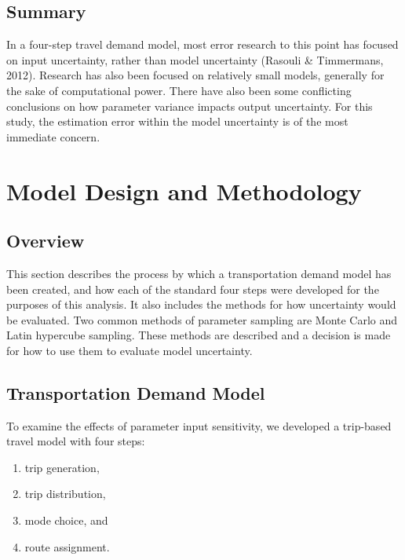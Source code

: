 \documentclass[fancy, masters,twoside]{byuthesis}
\providecommand{\tightlist}{%
  \setlength{\itemsep}{0pt}\setlength{\parskip}{0pt}}
\begin{document}
\hypertarget{summary}{%
\section{Summary}\label{summary}}

In a four-step travel demand model, most error research to this point has focused on input uncertainty, rather than model uncertainty (Rasouli \& Timmermans, 2012). Research has also been focused on relatively small models, generally for the sake of computational power. There have also been some conflicting conclusions on how parameter variance impacts output uncertainty. For this study, the estimation error within the model uncertainty is of the most immediate concern.

\hypertarget{model-design-and-methodology}{%
\chapter{Model Design and Methodology}\label{model-design-and-methodology}}

\hypertarget{overview-1}{%
\section{Overview}\label{overview-1}}

This section describes the process by which a transportation demand model has been created, and how each of the standard four steps were developed for the purposes of this analysis. It also includes the methods for how uncertainty would be evaluated. Two common methods of parameter sampling are Monte Carlo and Latin hypercube sampling. These methods are described and a decision is made for how to use them to evaluate model uncertainty.

\hypertarget{transportation-demand-model}{%
\section{Transportation Demand Model}\label{transportation-demand-model}}

To examine the effects of parameter input sensitivity, we developed a trip-based travel model with four steps:

\begin{enumerate}
\def\labelenumi{\arabic{enumi}.}
\tightlist
\item
  trip generation,
\item
  trip distribution,
\item
  mode choice, and
\item
  route assignment.
\end{enumerate}
\end{document}
